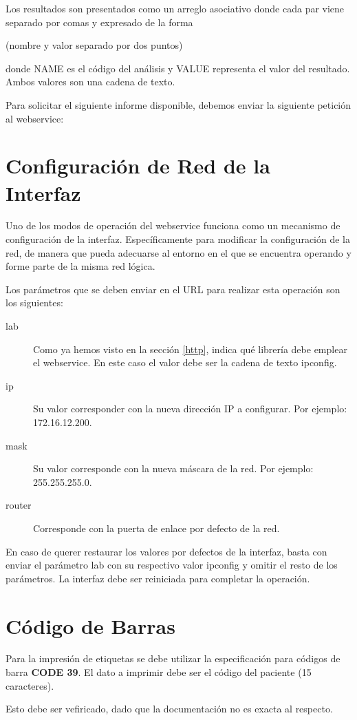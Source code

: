 \documentclass[titlepage,12pt]{article}
\begin{document}
Los resultados son presentados como un arreglo asociativo donde cada
par viene separado por comas y expresado de la forma

 (nombre y valor separado por dos puntos)

\noindent donde \textsf{NAME} es el código del análisis y
\textsf{VALUE} representa el valor del resultado. Ambos valores son
una cadena de texto.
 
Para solicitar el siguiente informe disponible, debemos enviar
la siguiente petición al webservice:


\section{Configuración de Red de la Interfaz}\label{netconfig}

Uno de los modos de operación del webservice funciona como un
mecanismo de configuración de la interfaz. Específicamente para
modificar la configuración de la red, de manera que pueda adecuarse al
entorno en el que se encuentra operando y forme parte de la misma red
lógica.

Los parámetros que se deben enviar en el URL para realizar esta
operación son los siguientes:

\begin{description}
\item[\textsf{lab}] Como ya hemos visto en la sección \ref{http},
  indica qué librería debe emplear el webservice. En este caso el
  valor debe ser la cadena de texto \textsf{ipconfig}.
\item[\textsf{ip}] Su valor corresponder con la nueva dirección IP a
  configurar. Por ejemplo: \textsf{172.16.12.200}.
\item[\textsf{mask}] Su valor corresponde con la nueva máscara de la
  red. Por ejemplo: \textsf{255.255.255.0}.
\item[\textsf{router}] Corresponde con la puerta de enlace por defecto de la red.
\end{description}

En caso de querer restaurar los valores por defectos de la interfaz,
basta con enviar el parámetro \textsf{lab} con su respectivo valor
\textsf{ipconfig} y omitir el resto de los parámetros. La interfaz
debe ser reiniciada para completar la operación.

\section{Código de Barras}\label{barcode}

Para la impresión de etiquetas se debe utilizar la
especificación para códigos de barra \textbf{CODE 39}. El dato a imprimir
debe ser el código del paciente (15 caracteres).

Esto debe ser vefiricado, dado que la documentación no es exacta al respecto.
\end{document}
